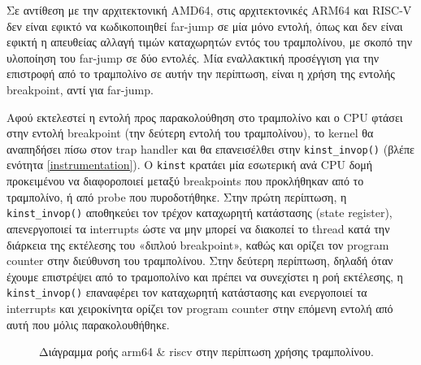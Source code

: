 \documentclass[12pt]{article}
\begin{document}
Σε αντίθεση με την αρχιτεκτονική AMD64, στις αρχιτεκτονικές ARM64 και RISC-V
δεν είναι εφικτό να κωδικοποιηθεί far-jump σε μία μόνο εντολή, όπως και δεν
είναι εφικτή η απευθείας αλλαγή τιμών καταχωρητών εντός του τραμπολίνου, με
σκοπό την υλοποίηση του far-jump σε δύο εντολές. Μία εναλλακτική προσέγγιση για
την επιστροφή από το τραμπολίνο σε αυτήν την περίπτωση, είναι η χρήση της
εντολής breakpoint, αντί για far-jump.

Αφού εκτελεστεί η εντολή προς παρακολούθηση στο τραμπολίνο και ο CPU φτάσει
στην εντολή breakpoint (την δεύτερη εντολή του τραμπολίνου), το kernel θα
αναπηδήσει πίσω στον trap handler και θα επανεισέλθει στην
\lstinline{kinst_invop()} (βλέπε ενότητα \ref{instrumentation}). Ο
\lstinline{kinst} κρατάει μία εσωτερική ανά CPU δομή προκειμένου να
διαφοροποιεί μεταξύ breakpoints που προκλήθηκαν από το τραμπολίνο, ή από probe
που πυροδοτήθηκε. Στην πρώτη περίπτωση, η \lstinline{kinst_invop()} αποθηκεύει
τον τρέχον καταχωρητή κατάστασης (state register), απενεργοποιεί τα interrupts
ώστε να μην μπορεί να διακοπεί το thread κατά την διάρκεια της εκτέλεσης του
«διπλού breakpoint», καθώς και ορίζει τον program counter στην διεύθυνση του
τραμπολίνου. Στην δεύτερη περίπτωση, δηλαδή όταν έχουμε επιστρέψει από το
τραμοπολίνο και πρέπει να συνεχίστει η ροή εκτέλεσης, η
\lstinline{kinst_invop()} επαναφέρει τον καταχωρητή κατάστασης και ενεργοποιεί
τα interrupts και χειροκίνητα ορίζει τον program counter στην επόμενη εντολή
από αυτή που μόλις παρακολουθήθηκε.

\begin{figure}[H]
\begin{center}
\end{center}
\caption{Διάγραμμα ροής arm64 \& riscv στην περίπτωση χρήσης τραμπολίνου.}
\label{armriscvflow}
\end{figure}
\end{document}
